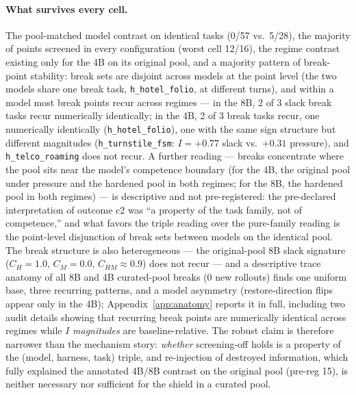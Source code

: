 \documentclass{article}
\theoremstyle{remark}
\begin{document}
\paragraph{What survives every cell.} The
pool-matched model contrast on identical tasks (0/57 vs.\ 5/28), the
majority of points screened in every configuration (worst cell 12/16), the
regime contrast existing only for the 4B on its original pool, and a
majority pattern of break-point stability: break sets are disjoint across
models at the point level (the two models share one break task,
\texttt{h\_hotel\_folio}, at different turns), and within a model most
break points recur across regimes --- in the 8B, 2 of 3 slack break tasks
recur numerically identically; in the 4B, 2 of 3 break tasks recur, one
numerically identically (\texttt{h\_hotel\_folio}), one with the same sign
structure but different magnitudes (\texttt{h\_turnstile\_fsm}:
$I=+0.77$ slack vs.\ $+0.31$ pressure), and \texttt{h\_telco\_roaming}
does not recur. A further reading --- breaks concentrate where the
pool sits near the model's competence boundary (for the 4B, the original
pool under pressure and the hardened pool in both regimes; for
the 8B, the hardened pool in both regimes) --- is descriptive and not
pre-registered: the pre-declared interpretation of outcome c2 was ``a
property of the task family, not of competence,'' and what favors the
triple reading over the pure-family reading is the point-level disjunction
of break sets between models on the identical pool. The break structure is
also heterogeneous --- the original-pool 8B slack signature ($C_H=1.0$, $C_M=0.0$,
$C_{HM}\approx0.9$) does not recur --- and a descriptive trace anatomy of
all 8B and 4B curated-pool breaks (0 new rollouts) finds one uniform base,
three recurring patterns, and a model asymmetry (restore-direction flips
appear only in the 4B); Appendix~\ref{app:anatomy} reports it in full,
including two audit details showing that recurring break points are
numerically identical across regimes while $I$ \emph{magnitudes} are
baseline-relative. The robust claim is
therefore narrower than the mechanism story: \emph{whether} screening-off
holds is a property of the (model, harness, task) triple, and re-injection of
destroyed information, which fully explained the annotated 4B/8B contrast
on the original pool (pre-reg 15), is neither necessary nor sufficient for the shield in a curated
pool.
\end{document}
